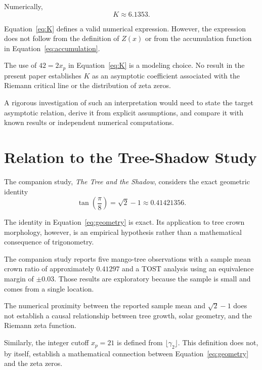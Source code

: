 \documentclass[11pt,a4paper]{article}
\begin{document}
Numerically,
\begin{equation}
K\approx6.1353.
\end{equation}

Equation~\eqref{eq:K} defines a valid numerical expression.
However, the expression does not follow from the definition
of \(Z(x)\) or from the accumulation function in
Equation~\eqref{eq:accumulation}.

The use of \(42=2x_p\) in Equation~\eqref{eq:K} is a modeling
choice. No result in the present paper establishes \(K\) as
an asymptotic coefficient associated with the Riemann
critical line or the distribution of zeta zeros.

A rigorous investigation of such an interpretation would
need to state the target asymptotic relation, derive it from
explicit assumptions, and compare it with known results or
independent numerical computations.

\section{Relation to the Tree-Shadow Study}

The companion study, \textit{The Tree and the Shadow},
considers the exact geometric identity
\begin{equation}
\tan\left(\frac{\pi}{8}\right)=\sqrt{2}-1
\approx0.41421356.
\label{eq:geometry}
\end{equation}

The identity in Equation~\eqref{eq:geometry} is exact.
Its application to tree crown morphology, however, is an
empirical hypothesis rather than a mathematical consequence
of trigonometry.

The companion study reports five mango-tree observations
with a sample mean crown ratio of approximately \(0.41297\)
and a TOST analysis using an equivalence margin of
\(\pm0.03\). Those results are exploratory because the sample
is small and comes from a single location.

The numerical proximity between the reported sample mean
and \(\sqrt{2}-1\) does not establish a causal relationship
between tree growth, solar geometry, and the Riemann zeta
function.

Similarly, the integer cutoff \(x_p=21\) is defined from
\(\lfloor\gamma_2\rfloor\). This definition does not, by
itself, establish a mathematical connection between
Equation~\eqref{eq:geometry} and the zeta zeros.
\end{document}
